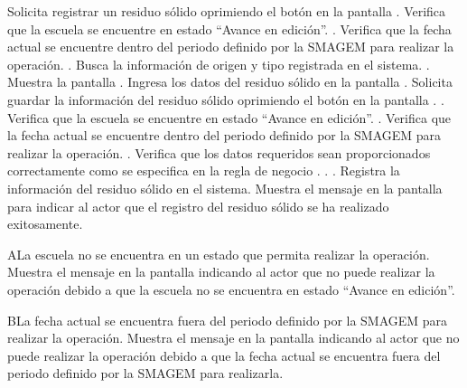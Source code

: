  \begin{UCtrayectoria}
    \UCpaso[\UCactor] Solicita registrar un residuo sólido oprimiendo el botón  en la pantalla .
    \UCpaso[\UCsist] Verifica que la escuela se encuentre en estado ``Avance en edición''. .
    \UCpaso[\UCsist] Verifica que la fecha actual se encuentre dentro del periodo definido por la SMAGEM para realizar la operación. .
    \UCpaso[\UCsist] Busca la información de origen y tipo registrada en el sistema. .
    \UCpaso[\UCsist] Muestra la pantalla .
    \UCpaso[\UCactor] Ingresa los datos del residuo sólido en la pantalla . \label{cus30:Registrar}
    \UCpaso[\UCactor] Solicita guardar la información del residuo sólido oprimiendo el botón  en la pantalla . .
    \UCpaso[\UCsist] Verifica que la escuela se encuentre en estado ``Avance en edición''. .
    \UCpaso[\UCsist] Verifica que la fecha actual se encuentre dentro del periodo definido por la SMAGEM para realizar la operación. .
    \UCpaso[\UCsist] Verifica que los datos requeridos sean proporcionados correctamente como se especifica en la regla de negocio . . .
    \UCpaso[\UCsist] Registra la información del residuo sólido en el sistema.
    \UCpaso[\UCsist] Muestra el mensaje  en la pantalla  para indicar al actor que el registro del residuo sólido se ha realizado exitosamente. 
    
 \end{UCtrayectoria}
 
   \begin{UCtrayectoriaA}{A}{La escuela no se encuentra en un estado que permita realizar la operación.}
    \UCpaso[\UCsist] Muestra el mensaje  en la pantalla  indicando al actor que no puede realizar la operación debido a que la escuela no se encuentra en estado ``Avance en edición''. 
 \end{UCtrayectoriaA}
 
    \begin{UCtrayectoriaA}{B}{La fecha actual se encuentra fuera del periodo definido por la SMAGEM para realizar la operación.}
    \UCpaso[\UCsist] Muestra el mensaje  en la pantalla  indicando al actor que no puede realizar la operación debido a que la fecha actual se encuentra fuera del periodo definido por la SMAGEM para realizarla. 
 \end{UCtrayectoriaA}
 
